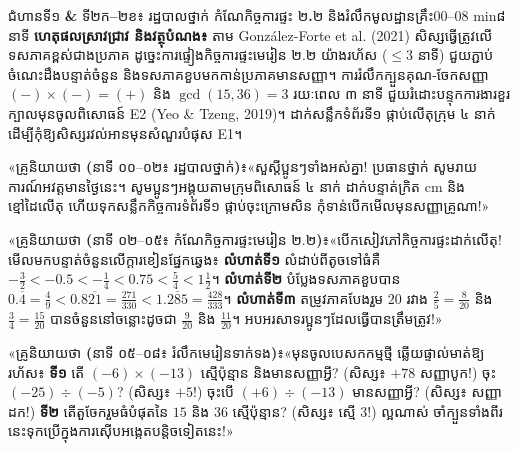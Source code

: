 \documentclass[a4paper,12pt]{article}
\newcommand{\en}[1]{{\TimesEn #1}}
\newcommand{\enbf}[1]{{\TimesEn\textbf{#1}}}
\newcommand{\teachersay}[1]{{\muol\fontsize{10.8pt}{15.5pt}\selectfont «គ្រូនិយាយថា \enbf{(}#1\enbf{)}៖}\hspace{0.25em}}
\begin{document}
\begin{phasebox}{ជំហានទី១ \enbf{\&} ទី២ក\enbf{--}២ខ៖ រដ្ឋបាលថ្នាក់ កំណែកិច្ចការផ្ទះ ២\enbf{.}២ និងរំលឹកមូលដ្ឋានគ្រឹះ}{00--08 min}{៨ នាទី}
\textbf{ហេតុផលស្រាវជ្រាវ និងវត្ថុបំណង៖} តាម \en{González-Forte et al. (2021)} សិស្សធ្វើត្រូវលើទសភាគខ្ពស់ជាងប្រភាគ ដូច្នេះការផ្ទៀងកិច្ចការផ្ទះមេរៀន ២.២ យ៉ាងរហ័ស ($\le 3$ នាទី) ជួយភ្ជាប់ចំណេះដឹងបន្ទាត់ចំនួន និងទសភាគខួបមកកាន់ប្រភាគមានសញ្ញា។ ការរំលឹកក្បួនគុណ-ចែកសញ្ញា $(-)\times(-)=(+)$ និង $\gcd(15,36)=3$ រយៈពេល ៣ នាទី ជួយរំដោះបន្ទុកការងារខួរក្បាលមុនចូលពិសោធន៍ \en{E2} \en{(Yeo \& Tzeng, 2019)}។ ដាក់សន្លឹកទំព័រទី១ ផ្កាប់លើតុក្រុម ៤ នាក់ដើម្បីកុំឱ្យសិស្សរវល់អានមុនសំណួរបំផុស \en{E1}។
\end{phasebox}
\begin{scriptbox}
  \teachersay{នាទី ០០--០២៖ រដ្ឋបាលថ្នាក់}«សួស្ដីប្អូនៗទាំងអស់គ្នា! ប្រធានថ្នាក់ សូមរាយការណ៍អវត្តមានថ្ងៃនេះ។ សូមប្អូនៗអង្គុយតាមក្រុមពិសោធន៍ ៤ នាក់ ដាក់បន្ទាត់ក្រិត \en{cm} និងខ្មៅដៃលើតុ ហើយទុកសន្លឹកកិច្ចការទំព័រទី១ ផ្កាប់ចុះក្រោមសិន កុំទាន់បើកមើលមុនសញ្ញាគ្រូណា!»\par\vspace{2.5pt}
  \teachersay{នាទី ០២--០៥៖ កំណែកិច្ចការផ្ទះមេរៀន ២.២}«បើកសៀវភៅកិច្ចការផ្ទះដាក់លើតុ! មើលមកបន្ទាត់ចំនួនលើក្ដារខៀនផ្នែកឆ្វេង៖ \textbf{លំហាត់ទី១} លំដាប់ពីតូចទៅធំគឺ $-\frac{3}{2} < -0.5 < -\frac{1}{4} < 0.75 < \frac{5}{4} < 1\frac{1}{2}$។ \textbf{លំហាត់ទី២} បំប្លែងទសភាគខួបបាន $0.\overline{4}=\frac{4}{9} < 0.8\overline{21}=\frac{271}{330} < 1.\overline{285}=\frac{428}{333}$។ \textbf{លំហាត់ទី៣} តម្រូវភាគបែងរួម $20$ រវាង $\frac{2}{5}=\frac{8}{20}$ និង $\frac{3}{4}=\frac{15}{20}$ បានចំនួននៅចន្លោះដូចជា $\frac{9}{20}$ និង $\frac{11}{20}$។ អបអរសាទរប្អូនៗដែលធ្វើបានត្រឹមត្រូវ!»\par\vspace{2.5pt}
  \teachersay{នាទី ០៥--០៨៖ រំលឹកមេរៀនទាក់ទង}«មុនចូលបេសកកម្មថ្មី ឆ្លើយផ្ទាល់មាត់ឱ្យរហ័ស៖ \textbf{ទី១} តើ $(-6)\times(-13)$ ស្មើប៉ុន្មាន និងមានសញ្ញាអ្វី? (សិស្ស៖ $+78$ សញ្ញាបូក!) ចុះ $(-25)\div(-5)$? (សិស្ស៖ $+5$!) ចុះបើ $(+6)\div(-13)$ មានសញ្ញាអ្វី? (សិស្ស៖ សញ្ញាដក!) \textbf{ទី២} តើតួចែករួមធំបំផុតនៃ $15$ និង $36$ ស្មើប៉ុន្មាន? (សិស្ស៖ ស្មើ $3$!) ល្អណាស់ ចាំក្បួនទាំងពីរនេះទុកប្រើក្នុងការស៊ើបអង្កេតបន្តិចទៀតនេះ!»
\end{scriptbox}
\end{document}
